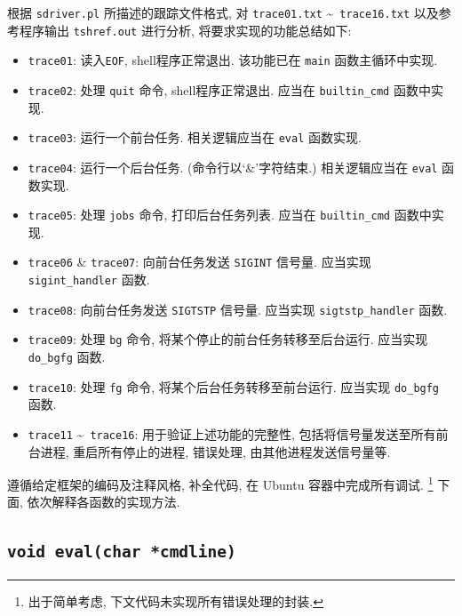 根据 \verb|sdriver.pl| 所描述的跟踪文件格式, 对 \verb|trace01.txt| \textasciitilde\ \verb|trace16.txt| 以及参考程序输出 \verb|tshref.out| 进行分析, 将要求实现的功能总结如下:
\begin{itemize}
    \item \verb|trace01|: 读入\verb|EOF|, shell程序正常退出. 该功能已在 \verb|main| 函数主循环中实现.
    \item \verb|trace02|: 处理 \verb|quit| 命令, shell程序正常退出. 应当在 \verb|builtin_cmd| 函数中实现.
    \item \verb|trace03|: 运行一个前台任务. 相关逻辑应当在 \verb|eval| 函数实现.
    \item \verb|trace04|: 运行一个后台任务. (命令行以‘\&’字符结束.) 相关逻辑应当在 \verb|eval| 函数实现.
    \item \verb|trace05|: 处理 \verb|jobs| 命令, 打印后台任务列表. 应当在 \verb|builtin_cmd| 函数中实现.
    \item \verb|trace06| \& \verb|trace07|: 向前台任务发送 \verb|SIGINT| 信号量. 应当实现 \verb|sigint_handler| 函数.
    \item \verb|trace08|: 向前台任务发送 \verb|SIGTSTP| 信号量. 应当实现 \verb|sigtstp_handler| 函数. 
    \item \verb|trace09|: 处理 \verb|bg| 命令, 将某个停止的前台任务转移至后台运行. 应当实现 \verb|do_bgfg| 函数. 
    \item \verb|trace10|: 处理 \verb|fg| 命令, 将某个后台任务转移至前台运行. 应当实现 \verb|do_bgfg| 函数. 
    \item \verb|trace11| \textasciitilde\ \verb|trace16|: 用于验证上述功能的完整性, 包括将信号量发送至所有前台进程, 重启所有停止的进程, 错误处理, 由其他进程发送信号量等.
\end{itemize}

遵循给定框架的编码及注释风格, 补全代码, 在 Ubuntu 容器中完成所有调试. \footnote{出于简单考虑, 下文代码未实现所有错误处理的封装.} 下面, 依次解释各函数的实现方法.

\subsection{\texttt{void eval(char *cmdline)}}

